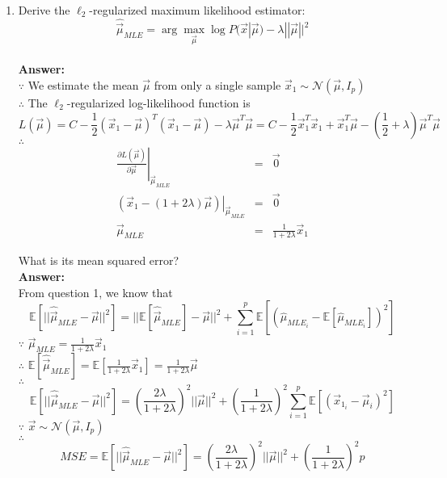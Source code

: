 \documentclass{article}
\begin{document}
\begin{enumerate}
	\item Derive the $\ell_2$-regularized maximum likelihood estimator:
	$$\hat{\vec{\mu}}_{MLE}=\arg\max_{\vec{\mu}}\log P(\vec{x}|\vec{\mu})-\lambda ||\vec{\mu}||^2$$ 
	\\\textbf{Answer:}\\
	$\because$ We estimate the mean $\vec{\mu}$ from only a single sample $\vec{x}_1 \sim \mathcal{N}(\vec{\mu},I_p)$ \\
	$\therefore$ The $\ell_2$-regularized log-likelihood function is
	$$L(\vec{\mu}) = C - \frac{1}{2}(\vec{x}_1-\vec{\mu})^T(\vec{x}_1-\vec{\mu})-\lambda\vec{\mu}^T\vec{\mu}=C-\frac{1}{2}\vec{x}_1^T\vec{x}_1+\vec{x}_1^T\vec{\mu}-(\frac{1}{2}+\lambda)\vec{\mu}^T\vec{\mu}$$
	$\therefore$
	\begin{equation}
	\nonumber
	\begin{array}{rcl}
	\left.\frac{\partial L(\vec{\mu})}{\partial \vec{\mu}}\right|_{\vec{\mu}_{MLE}} & = & \vec{0} \\
	\left.(\vec{x}_1-(1+2\lambda)\vec{\mu})\right|_{\vec{\mu}_{MLE}} & = & \vec{0} \\
	\vec{\mu}_{MLE} & = & \frac{1}{1+2\lambda}\vec{x}_1
	\end{array}
	\end{equation}
	
	What is its mean squared error?
	\\\textbf{Answer:}\\
	From question 1, we know that
	$$\mathbb{E}[||\hat{\vec{\mu}}_{MLE}-\vec{\mu}||^2]=||\mathbb{E}[\hat{\vec{\mu}}_{MLE}]-\vec{\mu}||^2 + \sum_{i=1}^{p}{\mathbb{E}[(\hat{\mu}_{MLE_i}-\mathbb{E}[\hat{\mu}_{MLE_i}])^2]}$$
	$\because$ $\vec{\mu}_{MLE}=\frac{1}{1+2\lambda}\vec{x}_1$\\
	$\therefore$ $\mathbb{E}[\hat{\vec{\mu}}_{MLE}]=\mathbb{E}[\frac{1}{1+2\lambda}\vec{x}_1]=\frac{1}{1+2\lambda}\vec{\mu}$\\
	$\therefore$ $$\mathbb{E}[||\hat{\vec{\mu}}_{MLE}-\vec{\mu}||^2]=(\frac{2\lambda}{1+2\lambda})^2||\vec{\mu}||^2+(\frac{1}{1+2\lambda})^2\sum_{i=1}^{p}{\mathbb{E}[(\vec{x}_{1_i}-\vec{\mu}_i)^2]}$$
	$\because$ $\vec{x}\sim\mathcal{N}(\vec{\mu},I_p)$\\
	$\therefore$ $$MSE=\mathbb{E}[||\hat{\vec{\mu}}_{MLE}-\vec{\mu}||^2]=(\frac{2\lambda}{1+2\lambda})^2||\vec{\mu}||^2+(\frac{1}{1+2\lambda})^2p$$
		

\end{enumerate}
\end{document}
